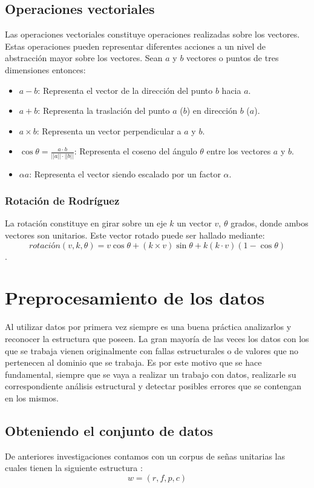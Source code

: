 \subsection{Operaciones vectoriales}

Las operaciones vectoriales constituye operaciones realizadas sobre los vectores. Estas operaciones 
pueden representar diferentes acciones a un nivel de abstracción mayor sobre los vectores. Sean $a$ y
$b$ vectores o puntos de tres dimensiones entonces:

\begin{itemize}
	\item $a - b$: Representa el vector de la dirección del punto $b$ hacia $a$.
	\item $a + b$: Representa la traslación del punto $a$ ($b$) en dirección $b$ ($a$).
	\item $a \times b$: Representa un vector perpendicular a $a$ y $b$.
	\item $\cos \theta = \frac{a \cdot b}{||a|| \cdot ||b||}$: Representa el coseno del ángulo $\theta$
	entre los vectores $a$ y $b$.
	\item $\alpha a$: Representa el vector siendo escalado por un factor $\alpha$.
\end{itemize}

\subsubsection{Rotación de Rodríguez}

La rotación constituye en girar sobre un eje $k$ un vector $v$, $\theta$ grados, donde ambos vectores son 
unitarios. Este vector rotado puede ser hallado mediante:
$$
rotación(v, k, \theta) = v \cos \theta + (k \times v) \sin \theta + k(k \cdot v)(1 - \cos \theta)
$$.


\section{Preprocesamiento de los datos}
Al utilizar datos por primera vez siempre es una buena práctica analizarlos y reconocer la estructura que poseen. La gran mayoría de las veces los datos con los que se trabaja vienen originalmente con fallas estructurales o de valores que no pertenecen al dominio que se trabaja. Es por este motivo que se hace fundamental, siempre que se vaya a realizar un trabajo con datos, realizarle su correspondiente análisis estructural y detectar posibles errores que se contengan en los mismos.
\subsection{Obteniendo el conjunto de datos}
De anteriores investigaciones contamos con un corpus de señas unitarias las cuales tienen la siguiente estructura :
$$
w = (r,f,p,c)
$$
 
